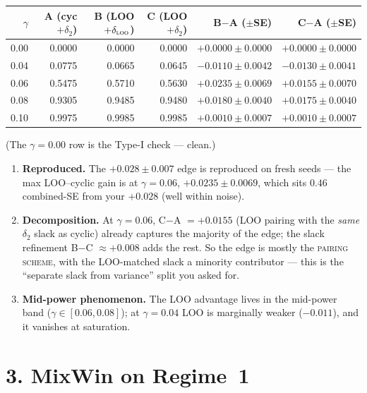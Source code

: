 \documentclass[11pt,a4paper]{article}
\begin{document}
\medskip
\begin{center}
\setlength{\tabcolsep}{5pt}
\begin{tabular}{rrrrrr}
\toprule
$\gamma$ & A (cyc$+\delta_2$) & B (LOO$+\delta_{\textsc{loo}}$) &
  C (LOO$+\delta_2$) & B$-$A ($\pm$SE) & C$-$A ($\pm$SE) \\
\midrule
0.00 & 0.0000 & 0.0000 & 0.0000 & $+0.0000 \pm 0.0000$ & $+0.0000 \pm 0.0000$ \\
0.04 & 0.0775 & 0.0665 & 0.0645 & $-0.0110 \pm 0.0042$ & $-0.0130 \pm 0.0041$ \\
0.06 & 0.5475 & 0.5710 & 0.5630 & $+0.0235 \pm 0.0069$ & $+0.0155 \pm 0.0070$ \\
0.08 & 0.9305 & 0.9485 & 0.9480 & $+0.0180 \pm 0.0040$ & $+0.0175 \pm 0.0040$ \\
0.10 & 0.9975 & 0.9985 & 0.9985 & $+0.0010 \pm 0.0007$ & $+0.0010 \pm 0.0007$ \\
\bottomrule
\end{tabular}
\end{center}
\medskip

\noindent (The $\gamma = 0.00$ row is the Type-I check --- clean.)

\begin{enumerate}
\item \textbf{Reproduced.} The $+0.028 \pm 0.007$ edge is reproduced on fresh
  seeds --- the max LOO--cyclic gain is at $\gamma = 0.06$,
  $+0.0235 \pm 0.0069$, which sits $0.46$ combined-SE from your $+0.028$ (well
  within noise).
\item \textbf{Decomposition.} At $\gamma = 0.06$, C$-$A $= +0.0155$ (LOO pairing
  with the \emph{same} $\delta_2$ slack as cyclic) already captures the majority
  of the edge; the slack refinement B$-$C $\approx +0.008$ adds the rest. So the
  edge is mostly the \textsc{pairing scheme}, with the LOO-matched slack a
  minority contributor --- this is the ``separate slack from variance'' split you
  asked for.
\item \textbf{Mid-power phenomenon.} The LOO advantage lives in the mid-power
  band ($\gamma \in [0.06, 0.08]$); at $\gamma = 0.04$ LOO is marginally weaker
  ($-0.011$), and it vanishes at saturation.
\end{enumerate}

\section*{3. MixWin on Regime~1}
\end{document}

